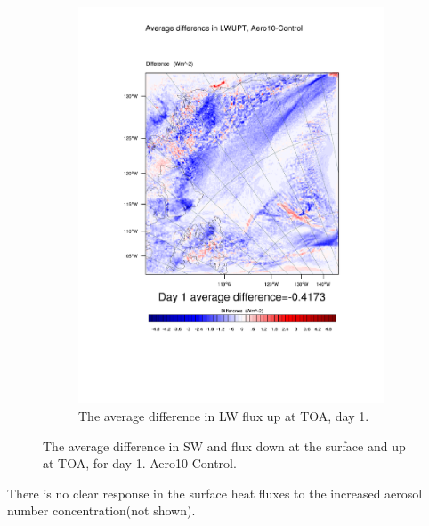 \begin{figure}
\begin{subfigure}{0.48\textwidth}
		\includegraphics[width=\textwidth]{results/aero10/diff_Aero10_LWUPT_Day1.pdf}
		\caption{The average difference in LW flux up at TOA, day 1.}
		\label{subfig:lwup_r3Day1}
	\end{subfigure}
	\caption{The average difference in SW and flux down at the surface and up at TOA, for day 1. Aero10-Control.}
	\label{fig:radiation_r3Day1}
\end{figure}

There is no clear response in the surface heat fluxes to the increased aerosol number concentration(not shown).

\clearpage
